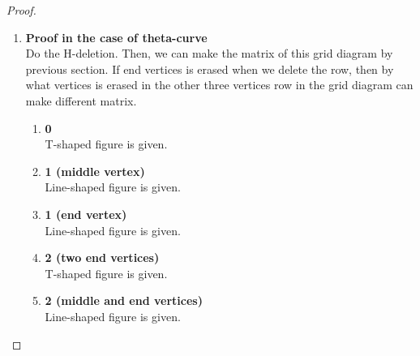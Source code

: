 \documentclass{article}
\theoremstyle{definition}
\begin{document}
\begin{proof}
\begin{enumerate}
\item \textbf{Proof in the case of theta-curve}\\
Do the H-deletion. Then, we can make the matrix of this grid diagram by previous section. If end vertices is erased when we delete the row, then by what vertices is erased in the other three vertices row in the grid diagram can make different matrix.
\begin{enumerate}
    \item \textbf{0}\\
    T-shaped figure is given.
    \item \textbf{1 (middle vertex)}\\
    Line-shaped figure is given.
    \item \textbf{1 (end vertex)}\\
    Line-shaped figure is given.
    \item \textbf{2 (two end vertices)}\\
    T-shaped figure is given.
    \item \textbf{2 (middle and end vertices)}\\
    Line-shaped figure is given.
\end{enumerate}


\end{enumerate}
\end{proof}
\end{document}
